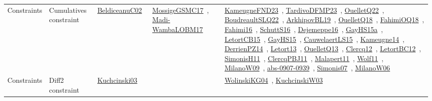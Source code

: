 {\begin{longtable}{lp{3cm}>{\raggedright\arraybackslash}p{6cm}>{\raggedright\arraybackslash}p{6cm}>{\raggedright\arraybackslash}p{8cm}}
Constraints & Cumulatives constraint & \href{../works/BeldiceanuC02.pdf}{BeldiceanuC02}~\cite{BeldiceanuC02} & \href{../works/MossigeGSMC17.pdf}{MossigeGSMC17}~\cite{MossigeGSMC17}, \href{../works/Madi-WambaLOBM17.pdf}{Madi-WambaLOBM17}~\cite{Madi-WambaLOBM17} & \href{../works/KameugneFND23.pdf}{KameugneFND23}~\cite{KameugneFND23}, \href{../works/TardivoDFMP23.pdf}{TardivoDFMP23}~\cite{TardivoDFMP23}, \href{../works/OuelletQ22.pdf}{OuelletQ22}~\cite{OuelletQ22}, \href{../works/BoudreaultSLQ22.pdf}{BoudreaultSLQ22}~\cite{BoudreaultSLQ22}, \href{../works/ArkhipovBL19.pdf}{ArkhipovBL19}~\cite{ArkhipovBL19}, \href{../works/OuelletQ18.pdf}{OuelletQ18}~\cite{OuelletQ18}, \href{../works/FahimiOQ18.pdf}{FahimiOQ18}~\cite{FahimiOQ18}, \href{../works/Fahimi16.pdf}{Fahimi16}~\cite{Fahimi16}, \href{../works/SchuttS16.pdf}{SchuttS16}~\cite{SchuttS16}, \href{../works/Dejemeppe16.pdf}{Dejemeppe16}~\cite{Dejemeppe16}, \href{../works/GayHS15a.pdf}{GayHS15a}~\cite{GayHS15a}, \href{../works/LetortCB15.pdf}{LetortCB15}~\cite{LetortCB15}, \href{../works/GayHS15.pdf}{GayHS15}~\cite{GayHS15}, \href{../works/CauwelaertLS15.pdf}{CauwelaertLS15}~\cite{CauwelaertLS15}, \href{../works/Kameugne14.pdf}{Kameugne14}~\cite{Kameugne14}, \href{../works/DerrienPZ14.pdf}{DerrienPZ14}~\cite{DerrienPZ14}, \href{../works/Letort13.pdf}{Letort13}~\cite{Letort13}, \href{../works/OuelletQ13.pdf}{OuelletQ13}~\cite{OuelletQ13}, \href{../works/Clercq12.pdf}{Clercq12}~\cite{Clercq12}, \href{../works/LetortBC12.pdf}{LetortBC12}~\cite{LetortBC12}, \href{../works/SimonisH11.pdf}{SimonisH11}~\cite{SimonisH11}, \href{../works/ClercqPBJ11.pdf}{ClercqPBJ11}~\cite{ClercqPBJ11}, \href{../works/Malapert11.pdf}{Malapert11}~\cite{Malapert11}, \href{../works/Wolf11.pdf}{Wolf11}~\cite{Wolf11}, \href{../works/MilanoW09.pdf}{MilanoW09}~\cite{MilanoW09}, \href{../works/abs-0907-0939.pdf}{abs-0907-0939}~\cite{abs-0907-0939}, \href{../works/Simonis07.pdf}{Simonis07}~\cite{Simonis07}, \href{../works/MilanoW06.pdf}{MilanoW06}~\cite{MilanoW06}\\
Constraints & Diff2 constraint & \href{../works/Kuchcinski03.pdf}{Kuchcinski03}~\cite{Kuchcinski03} &  & \href{../works/WolinskiKG04.pdf}{WolinskiKG04}~\cite{WolinskiKG04}, \href{../works/KuchcinskiW03.pdf}{KuchcinskiW03}~\cite{KuchcinskiW03}\\

\end{longtable}}
